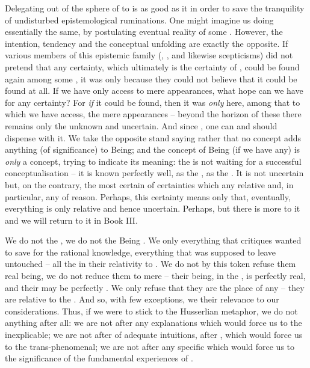 \pa Delegating  out of the sphere of  to  is as good as  it in order to save the
tranquility of undisturbed epistemological ruminations.  One might imagine us
doing essentially the same, by postulating eventual reality of some
.  However, the intention, tendency and the conceptual
unfolding are exactly the opposite.  If various members of this epistemic family
(, , and likewise scepticisms) did not
pretend that any certainty, which ultimately is the certainty of ,
could be found again among some , it was only because they could not
believe that it could be found at all. If we have only access to mere
appearances, what hope can we have for any certainty? For {\em if} it could be
found, then it was {\em only} here, among that to which we have access, the mere
appearances -- beyond the horizon of these   there
remains only the unknown and uncertain.  And since , one can and should dispense with it.  We take the
opposite stand saying rather that no concept adds anything (of significance) to
Being; and the concept of Being (if we have any) is {\em only} a concept, trying
to indicate its meaning: the  is not  waiting for a
successful conceptualisation -- it is known perfectly well, as the
, as the . It is not uncertain but, on the
contrary, the most certain of certainties which  any relative
 and, in particular, any  of reason.
Perhaps, this certainty means only that, eventually, everything  is
only relative and hence uncertain. Perhaps, but there is more to it and we will
return to it in Book III.
  
We do not  the , we do not  the Being
 . We only  everything that critiques
wanted to save for the rational knowledge, everything that  was
supposed to leave untouched -- all the  in their relativity to
. We do not by this token refuse them real being, we do not reduce
them to mere  -- their being,  in the , is
perfectly real, and their  may be perfectly . We
only refuse that they are the place of any   --
they are relative to the . And so, with few
exceptions, we  their relevance to our considerations.  Thus, if we
were to stick to the Husserlian metaphor, we do not  anything after
all: we are not after any  explanations which would force us to
 the inexplicable; we are not after  of adequate
intuitions, after , which would force us to  the
trans-phenomenal; we are not after any specific  which would force
us to  the significance of the fundamental experiences of
.

